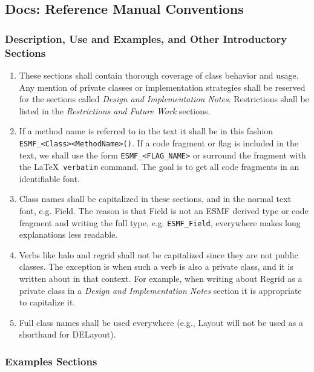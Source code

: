 \subsection{Docs: Reference Manual Conventions}

\subsubsection{Description, Use and Examples, and Other Introductory Sections}

\begin{enumerate}
\item These sections shall contain thorough coverage of class
behavior and usage.  Any mention of private classes or implementation 
strategies shall be reserved for the sections called {\it Design and 
Implementation Notes}.  Restrictions shall be listed in the 
{\it Restrictions and Future Work} sections.
  
\item If a method name is referred to in the text it shall be in this
fashion {\tt ESMF\_<Class><MethodName>()}.  If a code fragment or flag is
included in the text, we shall use the form {\tt ESMF\_<FLAG\_NAME>} 
or surround the fragment with the \LaTeX\ {\tt verbatim} command.  The 
goal is to get all code fragments in an identifiable font.

\item Class names shall be capitalized in these sections, and
in the normal text font, e.g. Field.  The reason is that 
Field is not an ESMF derived type or code fragment and writing 
the full type, e.g. {\tt ESMF\_Field}, everywhere makes long 
explanations less readable.

\item Verbs like halo and regrid shall not be capitalized since they 
are not public classes. The exception is when such a verb is also a
private class, and it is written about in that context.  For example, 
when writing about Regrid as a private class in a {\it Design and 
Implementation Notes} section it is appropriate to capitalize it.

\item Full class names shall be used everywhere (e.g., Layout will
not be used as a shorthand for DELayout).

\end{enumerate}

\subsubsection{Examples Sections}

